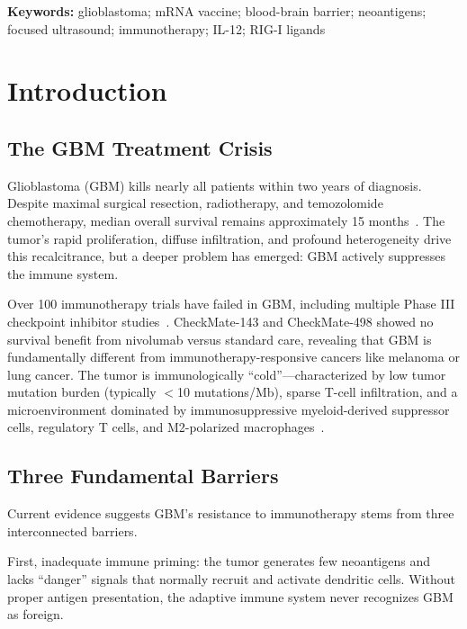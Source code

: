 \documentclass[12pt]{article}
\begin{document}
\noindent\textbf{Keywords:} glioblastoma; mRNA vaccine; blood-brain barrier; neoantigens; focused ultrasound; immunotherapy; IL-12; RIG-I ligands

\newpage

\section{Introduction}

\subsection{The GBM Treatment Crisis}
Glioblastoma (GBM) kills nearly all patients within two years of diagnosis. Despite maximal surgical resection, radiotherapy, and temozolomide chemotherapy, median overall survival remains approximately 15 months~\citep{lim2024}. The tumor's rapid proliferation, diffuse infiltration, and profound heterogeneity drive this recalcitrance, but a deeper problem has emerged: GBM actively suppresses the immune system.

Over 100 immunotherapy trials have failed in GBM, including multiple Phase III checkpoint inhibitor studies~\citep{chen2024,reardon2020}. CheckMate-143 and CheckMate-498 showed no survival benefit from nivolumab versus standard care, revealing that GBM is fundamentally different from immunotherapy-responsive cancers like melanoma or lung cancer. The tumor is immunologically ``cold''—characterized by low tumor mutation burden (typically $<$10 mutations/Mb), sparse T-cell infiltration, and a microenvironment dominated by immunosuppressive myeloid-derived suppressor cells, regulatory T cells, and M2-polarized macrophages~\citep{liau2023}.

\subsection{Three Fundamental Barriers}
Current evidence suggests GBM's resistance to immunotherapy stems from three interconnected barriers.

First, inadequate immune priming: the tumor generates few neoantigens and lacks ``danger'' signals that normally recruit and activate dendritic cells. Without proper antigen presentation, the adaptive immune system never recognizes GBM as foreign.
\end{document}
